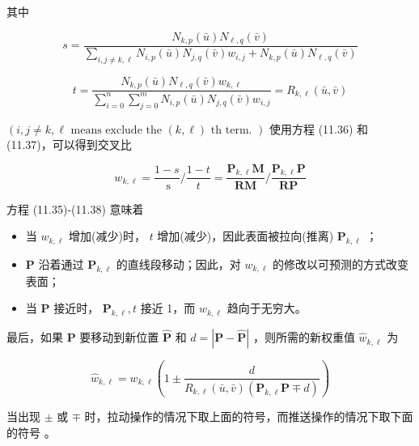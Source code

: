 \documentclass[../main.tex]{subfiles}
\begin{document}
其中

\[
s = \frac{{N}_{k,p}\left( \bar{u}\right) {N}_{\ell ,q}\left( \bar{v}\right) }{\mathop{\sum }\limits_{{i,j \neq  k,\ell }}{N}_{i,p}\left( \bar{u}\right) {N}_{j,q}\left( \bar{v}\right) {w}_{i,j} + {N}_{k,p}\left( \bar{u}\right) {N}_{\ell ,q}\left( \bar{v}\right) }
\]

\[
t = \frac{{N}_{k,p}\left( \bar{u}\right) {N}_{\ell ,q}\left( \bar{v}\right) {w}_{k,\ell }}{\mathop{\sum }\limits_{{i = 0}}^{n}\mathop{\sum }\limits_{{j = 0}}^{m}{N}_{i,p}\left( \bar{u}\right) {N}_{j,q}\left( \bar{v}\right) {w}_{i,j}} = {R}_{k,\ell }\left( {\bar{u},\bar{v}}\right)  \tag{11.37}
\]

\(\left( {i,j \neq  k,\ell \text{ means exclude the }\left( {k,\ell }\right) \text{ th term. }}\right)\) 使用方程 (11.36) 和 (11.37)，可以得到交叉比

\[
{w}_{k,\ell } = \frac{1 - s}{\mathrm{\;s}}/\frac{1 - t}{t} = \frac{{\mathbf{P}}_{k,\ell }\mathbf{M}}{\mathbf{{RM}}}/\frac{{\mathbf{P}}_{k,\ell }\mathbf{P}}{\mathbf{{RP}}} \tag{11.38}
\]

方程 (11.35)-(11.38) 意味着

\begin{itemize}
\item 当 \({w}_{k,\ell }\) 增加(减少)时， \(t\) 增加(减少)，因此表面被拉向(推离) \({\mathbf{P}}_{k,\ell }\) ；
\end{itemize}

\begin{itemize}
\item \(\mathbf{P}\) 沿着通过 \({\mathbf{P}}_{k,\ell }\) 的直线段移动；因此，对 \({w}_{k,\ell }\) 的修改以可预测的方式改变表面；
\end{itemize}

\begin{itemize}
\item 当 \(\mathbf{P}\) 接近时， \({\mathbf{P}}_{k,\ell },t\) 接近 1，而 \({w}_{k,\ell }\) 趋向于无穷大。
\end{itemize}

最后，如果 \(\mathbf{P}\) 要移动到新位置 \(\widehat{\mathbf{P}}\) 和 \(d = \left| {\mathbf{P} - \widehat{\mathbf{P}}}\right|\) ，则所需的新权重值 \({\widehat{w}}_{k,\ell }\) 为

\[
{\widehat{w}}_{k,\ell } = {w}_{k,\ell }\left( {1 \pm  \frac{d}{{R}_{k,\ell }\left( {\bar{u},\bar{v}}\right) \left( {{\mathbf{P}}_{k,\ell }\mathbf{P} \mp  d}\right) }}\right)  \tag{11.39}
\]

当出现 \(\pm\) 或 \(\mp\) 时，拉动操作的情况下取上面的符号，而推送操作的情况下取下面的符号 \cite{Pieg89d}。
\end{document}
